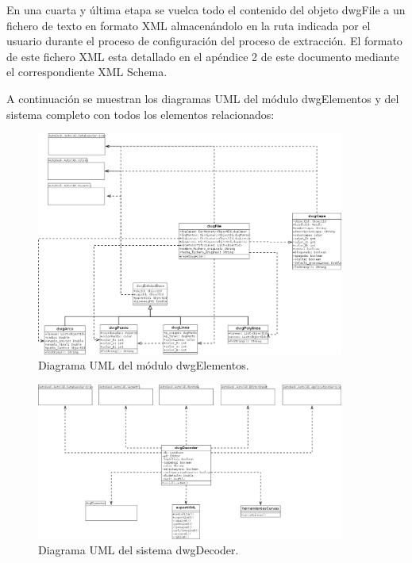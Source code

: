 \begin{itemize}
{En una cuarta y última etapa se vuelca todo el contenido del objeto dwgFile a un fichero de texto en formato XML almacenándolo en la ruta indicada por el usuario durante el proceso de configuración del proceso de extracción. El formato de este fichero XML esta detallado en el apéndice 2 de este documento mediante el correspondiente XML Schema.
}

\end{itemize}

A continuación se muestran los diagramas UML del módulo dwgElementos y del sistema completo con todos los elementos relacionados:

\begin{figure}
\begin{center}
\includegraphics[width=0.9\textwidth]{imgs/dwgElementos}
\caption{Diagrama UML del módulo dwgElementos.}
\end{center}
\end{figure}

\begin{figure}
\begin{center}
\includegraphics[width=0.9\textwidth]{imgs/dwgDecoder}
\caption{Diagrama UML del sistema dwgDecoder.}
\end{center}
\end{figure}